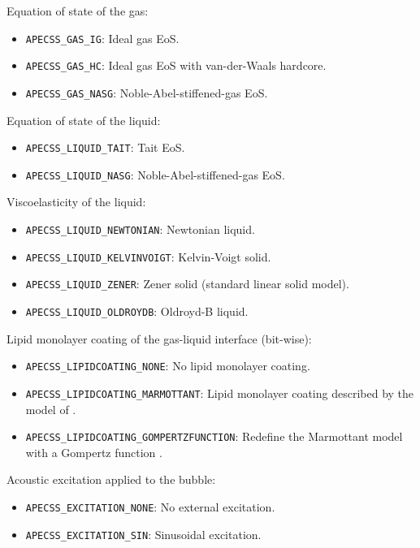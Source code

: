 Equation of state of the gas:\vspace{-1em}
\begin{itemize}[noitemsep]
  \item {\tt APECSS\_GAS\_IG}: Ideal gas EoS.
  \item {\tt APECSS\_GAS\_HC}: Ideal gas EoS with van-der-Waals hardcore.
  \item {\tt APECSS\_GAS\_NASG}: Noble-Abel-stiffened-gas EoS.
\end{itemize}

Equation of state of the liquid:\vspace{-1em}
\begin{itemize}[noitemsep]
  \item {\tt APECSS\_LIQUID\_TAIT}: Tait EoS.
  \item {\tt APECSS\_LIQUID\_NASG}: Noble-Abel-stiffened-gas EoS.
\end{itemize}

Viscoelasticity of the liquid:\vspace{-1em}
\begin{itemize}[noitemsep]
  \item {\tt APECSS\_LIQUID\_NEWTONIAN}: Newtonian liquid.
  \item {\tt APECSS\_LIQUID\_KELVINVOIGT}: Kelvin-Voigt solid.
  \item {\tt APECSS\_LIQUID\_ZENER}: Zener solid (standard linear solid model).
  \item {\tt APECSS\_LIQUID\_OLDROYDB}: Oldroyd-B liquid.
\end{itemize}

Lipid monolayer coating of the gas-liquid interface (bit-wise):\vspace{-1em}
\begin{itemize}[noitemsep]
  \item {\tt APECSS\_LIPIDCOATING\_NONE}: No lipid monolayer coating.
  \item {\tt APECSS\_LIPIDCOATING\_MARMOTTANT}: Lipid monolayer coating described by the model of \citet{Marmottant2005}.
  \item {\tt APECSS\_LIPIDCOATING\_GOMPERTZFUNCTION}: Redefine the Marmottant model with a Gompertz function \citep{Guemmer2021}.
\end{itemize}

Acoustic excitation applied to the bubble:\vspace{-1em}
\begin{itemize}[noitemsep]
  \item {\tt APECSS\_EXCITATION\_NONE}: No external excitation. 
  \item {\tt APECSS\_EXCITATION\_SIN}: Sinusoidal excitation.
\end{itemize}


